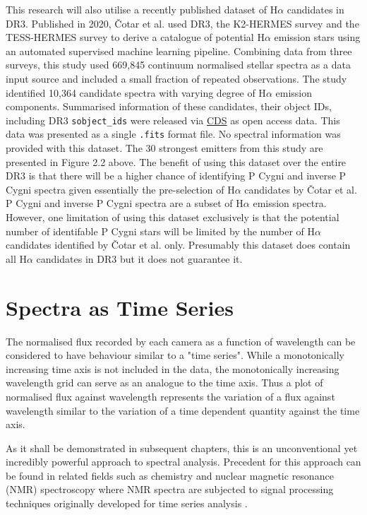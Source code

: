 This research will also utilise a recently published dataset of H$\alpha$ candidates in DR3. Published in 2020, Čotar et al. used DR3\cite{de2015galah}, the K2-HERMES survey\cite{wittenmyer2018k2} and the TESS-HERMES survey\cite{sharma2018tess} to derive a catalogue of potential H$\alpha$ emission stars using an automated supervised machine learning pipeline. Combining data from three surveys, this study used 669,845 continuum normalised stellar spectra as a data input source and included a small fraction of repeated observations. The study identified 10,364 candidate spectra with varying degree of H$\alpha$ emission components. Summarised information of these candidates, their object IDs, including DR3 \texttt{sobject\_ids} were released via \href{https://cdsweb.u-strasbg.fr/}{CDS} as open access data. This data was presented as a single \texttt{.fits} format file. No spectral information was provided with this dataset. The 30 strongest emitters from this study are presented in Figure 2.2 above. The benefit of using this dataset over the entire DR3 is that there will be a higher chance of identifying P Cygni and inverse P Cygni spectra given essentially the pre-selection of H$\alpha$ candidates by Čotar et al. P Cygni and inverse P Cygni spectra are a subset of H$\alpha$ emission spectra. However, one limitation of using this dataset exclusively is that the potential number of identifable P Cygni stars will be limited by the number of H$\alpha$ candidates identified by Čotar et al. only. Presumably this dataset does contain all H$\alpha$ candidates in DR3 but it does not guarantee it. 

\section{Spectra as Time Series}

The normalised flux recorded by each camera as a function of wavelength can be considered to have behaviour similar to a "time series". While a monotonically increasing time axis is not included in the data, the monotonically increasing wavelength grid can serve as an analogue to the time axis. Thus a plot of normalised flux against wavelength represents the variation of a flux against wavelength similar to the variation of a time dependent quantity against the time axis.

As it shall be demonstrated in subsequent chapters, this is an unconventional yet incredibly powerful approach to spectral analysis. Precedent for this approach can be found in related fields such as chemistry and nuclear magnetic resonance (NMR) spectroscopy where NMR spectra are subjected to signal processing techniques originally developed for time series analysis \cite{nielsen2019practical}. 

